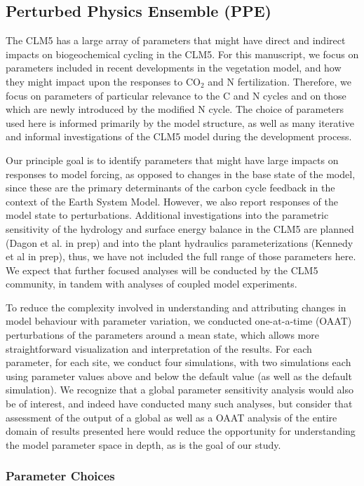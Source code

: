 \documentclass[draft,linenumbers]{agujournal}
\begin{document}
\subsection{Perturbed Physics Ensemble (PPE)}
The CLM5 has a large array of parameters that might have direct and indirect impacts on biogeochemical cycling in the CLM5. For this manuscript, we focus on parameters included in recent developments in the vegetation model, and how they might impact upon the responses to CO$_{2}$ and N fertilization. Therefore, 
we focus on parameters of particular relevance to the C and N cycles and on those which are newly introduced by the modified N cycle. The choice of parameters used here is informed primarily by the model structure, as well as many iterative and informal investigations of the CLM5 model during the development process. 

Our principle goal is to identify parameters that might have large impacts on responses to model forcing, as opposed to changes in the base state of the model, since these are the primary determinants of the carbon cycle feedback in the context of the Earth System Model. However, we also report responses of the model state to perturbations. Additional investigations into the parametric sensitivity of the hydrology and surface energy balance in the CLM5 are planned (Dagon et al. in prep) and into the plant hydraulics parameterizations (Kennedy et al in prep), thus, we have not included the full range of those parameters here. We expect that further focused analyses will be conducted by the CLM5 community, in tandem with analyses of coupled model experiments. 

To reduce the complexity involved in understanding and attributing changes in model behaviour with parameter variation, we conducted one-at-a-time (OAAT) perturbations of the parameters around a mean state, which allows more straightforward visualization and interpretation of the results. For each parameter, for each site, we conduct four simulations, with two simulations each using parameter values above and  below the default value (as well as the default simulation). We recognize that a global parameter sensitivity analysis would also be of interest, and indeed have conducted many such analyses, but consider that assessment of the output of a global as well as a OAAT analysis of the entire domain of results presented here would reduce the opportunity for understanding the model parameter space in depth, as is the goal of our study. 

\subsubsection{Parameter Choices}
\end{document}
